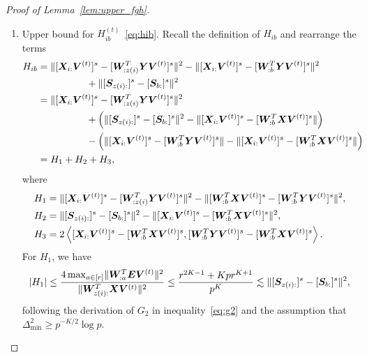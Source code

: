 \documentclass[lettersize,journal]{IEEEtran}
\theoremstyle{definition}
\theoremstyle{definition}
\newcommand{\of}[1]{\left(#1\right)}
\newcommand{\ang}[1]{\left\langle#1\right\rangle}
\begin{document}
\begin{proof}[Proof of Lemma~\ref{lem:upper_fgh}]
\begin{enumerate}
    \item Upper bound for $H_{ib}^{(t)}$~\eqref{eq:hib}. Recall the definition of $H_{ib}$ and rearrange the terms
    \begin{align}
        H_{ib} &= \onormSize{}{ [\mX_{i:} \mV^{(t)}]^s -  [  \mW_{:z(i)}^T \mY \mV^{(t)} ]^s}^2 - \onormSize{}{ [\mX_{i:} \mV^{(t)}]^s -  [  \mW_{:b}^T \mY \mV^{(t)} ]^s}^2\\
        & \quad \quad \quad \quad \quad + \onormSize{}{ [ \mS_{z(i):}  ]^s - [ \mS_{b:}  ]^s  }^2 \\
        & =  \onormSize{}{ [ \mX_{i:} \mV^{(t)}]^s -  [  \mW_{:z(i)}^T \mY \mV^{(t)} ]^s}^2 \\
        & \quad \quad \quad \quad \quad + \of{ \onormSize{}{ [ \mS_{z(i):}  ]^s - [ \mS_{b:}  ]^s  }^2 - \onormSize{}{ [\mX_{i:} \mV^{(t)}]^s-  [  \mW_{:b}^T \mX \mV^{(t)} ]^s }  } \\
        & \quad \quad \quad \quad \quad  - \of{\onormSize{}{ [\mX_{i:} \mV^{(t)}]^s-  [  \mW_{:b}^T \mY \mV^{(t)} ]^s } -  \onormSize{}{ [\mX_{i:} \mV^{(t)}]^s-  [  \mW_{:b}^T \mX \mV^{(t)} ]^s }   } \\
        & = H_1 + H_2 + H_3,
    \end{align}
    where 
    \begin{align}
        H_1 &= \onormSize{}{ [ \mX_{i:} \mV^{(t)}]^s -  [  \mW_{:z(i)}^T \mY \mV^{(t)} ]^s}^2 - \onormSize{}{ [ \mW_{:b}^T \mX \mV^{(t)}]^s -  [ \mW_{:b}^T \mY \mV^{(t)}]^s}^2, \\
        H_2 &=  \onormSize{}{ [ \mS_{z(i):}  ]^s - [ \mS_{b:}  ]^s  }^2 - \onormSize{}{ [\mX_{i:} \mV^{(t)}]^s-  [  \mW_{:b}^T \mX \mV^{(t)} ]^s }^2  , \\
        H_3 & = 2 \ang{  [\mX_{i:} \mV^{(t)}]^s  -  [  \mW_{:b}^T \mX \mV^{(t)} ]^s,  [  \mW_{:b}^T \mY \mV^{(t)} ]^s -  [  \mW_{:b}^T \mX \mV^{(t)} ]^s }.
    \end{align}
    For $H_1$, we have 
    \begin{align}
        |H_1| \leq  \frac{4 \max_{a \in [r]}\onormSize{}{ \mW_{:a}^T \mE \mV^{(t)} }^2 }{ \onormSize{}{ \mW_{z(i):}^T\mX \mV^{(t)}}^2}
         \leq  \frac{ r^{2K-1} + K p r^{K+1} }{p^{K}} 
        \lesssim  \onormSize{}{ [ \mS_{z(i):}  ]^s - [ \mS_{b:}  ]^s  }^2\label{eq:h1},
    \end{align}
    following the derivation of $G_2$ in inequality~\eqref{eq:g2} and the assumption that $\Delta_{\min}^2 \geq p^{-K/2} \log p$.

\end{enumerate}
\end{proof}
\end{document}
